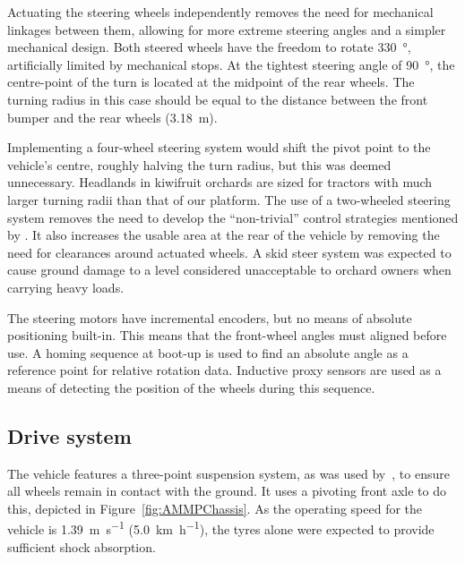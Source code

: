 \documentclass[preprint,authoryear,12pt]{elsarticle}
\begin{document}
        Actuating the steering wheels independently removes the need for mechanical linkages between them, allowing for more extreme steering angles and a simpler mechanical design.
        Both steered wheels have the freedom to rotate \SI{330}{\degree}, artificially limited by mechanical stops.
        At the tightest steering angle of \SI{90}{\degree}, the centre-point of the turn is located at the midpoint of the rear wheels.
        The turning radius in this case should be equal to the distance between the front bumper and the rear wheels (\SI{3.18}{\meter}).

        Implementing a four-wheel steering system would shift the pivot point to the vehicle's centre, roughly halving the turn radius, but this was deemed unnecessary.
        Headlands in kiwifruit orchards are sized for tractors with much larger turning radii than that of our platform.
        The use of a two-wheeled steering system removes the need to develop the ``non-trivial'' control strategies mentioned by \cite{Bak2004}.
        It also increases the usable area at the rear of the vehicle by removing the need for clearances around actuated wheels.
        A skid steer system was expected to cause ground damage to a level considered unacceptable to orchard owners when carrying heavy loads.

        The steering motors have incremental encoders, but no means of absolute positioning built-in.
        This means that the front-wheel angles must aligned before use.
        A homing sequence at boot-up is used to find an absolute angle as a reference point for relative rotation data.
        Inductive proxy sensors are used as a means of detecting the position of the wheels during this sequence.

    \subsection{Drive system}
    \label{sub:drive}
        The vehicle features a three-point suspension system, as was used by~\cite{Bak2004}, to ensure all wheels remain in contact with the ground.
        It uses a pivoting front axle to do this, depicted in Figure~\ref{fig:AMMPChassis}.
        As the operating speed for the vehicle is \SI{1.39}{\meter\per\second} (\SI{5.0}{\kilo\meter\per\hour}), the tyres alone were expected to provide sufficient shock absorption.

\end{document}
